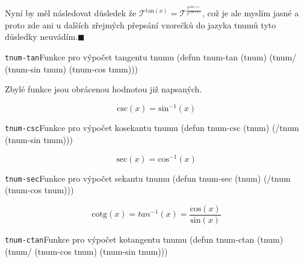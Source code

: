 \begin{convention}
Nyní by měl následovat důsledek že $\mathcal{T}^{\mathrm{tan}(x)}=\mathcal{T}^{\frac{\mathcal{T}^{\mathrm{sin}(x)}}{\mathcal{T}^{\mathrm{cos}(x)}}}$, což je ale myslím jasné a proto zde ani u dalších zřejmých přepsání vzorečků do jazyka tnumů tyto důsledky neuvádím.\hfill$\blacksquare$
\end{convention}

\begin{lispcode}{\texttt{tnum-tan}}{Funkce pro výpočet tangentu tnumu}
(\textcolor{funkcionalni}{defun} \textcolor{pojmenovan}{tnum-tan} (tnum)
  (\textcolor{moje}{tnum/} (\textcolor{moje}{tnum-sin} tnum) (\textcolor{moje}{tnum-cos} tnum)))
\end{lispcode}

Zbylé funkce jsou obrácenou hodnotou již napsaných.

\begin{fact}
  \begin{equation}
    \mathrm{csc}(x)=\mathrm{sin}^{-1}(x)
  \end{equation}
\end{fact}
\begin{lispcode}{\texttt{tnum-csc}}{Funkce pro výpočet kosekantu tnumu}
(\textcolor{funkcionalni}{defun} \textcolor{pojmenovan}{tnum-csc} (tnum)
  (\textcolor{moje}{/tnum} (\textcolor{moje}{tnum-sin} tnum)))
\end{lispcode}

\begin{fact}
  \begin{equation}
    \mathrm{sec}(x)=\mathrm{cos}^{-1}(x)
  \end{equation}
\end{fact}
\begin{lispcode}{\texttt{tnum-sec}}{Funkce pro výpočet sekantu tnumu}
(\textcolor{funkcionalni}{defun} \textcolor{pojmenovan}{tnum-sec} (tnum)
  (\textcolor{moje}{/tnum} (\textcolor{moje}{tnum-cos} tnum)))
\end{lispcode}

\begin{fact}
  \begin{equation}
    \mathrm{cotg}(x)=tan^{-1}(x)=\frac{\mathrm{cos}(x)}{\mathrm{sin}(x)}
  \end{equation}
\end{fact}
\begin{lispcode}{\texttt{tnum-ctan}}{Funkce pro výpočet kotangentu tnumu}
(\textcolor{funkcionalni}{defun} \textcolor{pojmenovan}{tnum-ctan} (tnum)
  (\textcolor{moje}{tnum/} (\textcolor{moje}{tnum-cos} tnum) (\textcolor{moje}{tnum-sin} tnum)))
\end{lispcode}

